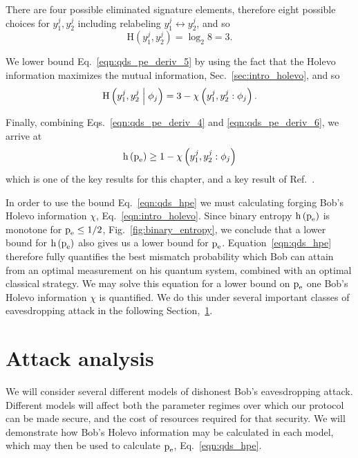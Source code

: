 \noindent There are four possible eliminated signature elements, therefore eight possible choices for $y_1^j, y_2^j$ including relabeling $y_1^j \leftrightarrow y_2^j$, and so 
\begin{equation}
\text{H}\left(y_1^j, y_2^j\right) = \log_2 8 = 3.
\end{equation}

\noindent We lower bound Eq.~\ref{eqn:qds_pe_deriv_5} by using the fact that the Holevo information maximizes the mutual information, Sec.~\ref{sec:intro_holevo}, and so
\begin{equation}\label{eqn:qds_pe_deriv_6}
\text{H}\left(y_1^j, y_2^j \; \middle| \; \phi_j \right) = 3 - \chi\left(y_1^j, y_2^j : \phi_j\right).
\end{equation}

\noindent Finally, combining Eqs.~\ref{eqn:qds_pe_deriv_4} and \ref{eqn:qds_pe_deriv_6}, we arrive at
\begin{equation}\label{eqn:qds_hpe}
\text{h}\left(\text{p}_{\text{e}}\right) \ge 1 - \chi \left(y_1^j, y_2^j : \phi_j\right)
\end{equation}
which is one of the key results for this chapter, and a key result of Ref.~\cite{Thornton2019}. %

In order to use the bound Eq.~\ref{eqn:qds_hpe} we must calculating forging Bob's Holevo information $\chi$, Eq.~\ref{eqn:intro_holevo}. Since binary entropy $\text{h}\left(\text{p}_{\text{e}}\right)$ is monotone for $\text{p}_{\text{e}} \le 1/2$, Fig.~\ref{fig:binary_entropy}, we conclude that a lower bound for $\text{h}\left(\text{p}_{\text{e}}\right)$ also gives us a lower bound for $\text{p}_{\text{e}}$. Equation~\ref{eqn:qds_hpe} therefore fully quantifies the best mismatch probability which Bob can attain from an optimal measurement on his quantum system, combined with an optimal classical strategy. We may solve this equation for a lower bound on $\text{p}_{\text{e}}$ one Bob's Holevo information $\chi$ is quantified. We do this under several important classes of eavesdropping attack in the following Section,~\ref{sec:qds_attack_analysis}.


\section{Attack analysis}\label{sec:qds_attack_analysis}
We will consider several different models of dishonest Bob's eavesdropping attack. Different models will affect both the parameter regimes over which our protocol can be made secure, and the cost of resources required for that security. We will demonstrate how Bob's Holevo information may be calculated in each model, which may then be used to calculate $\text{p}_{\text{e}}$, Eq.~\ref{eqn:qds_hpe}.

